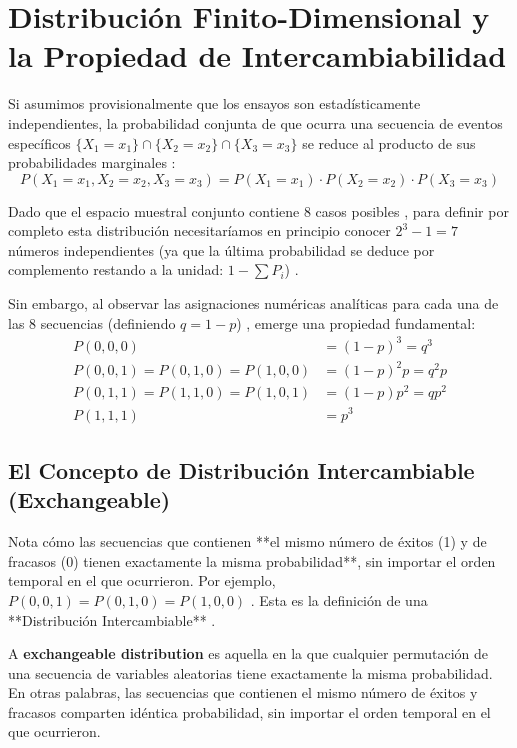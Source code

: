 \section{Distribución Finito-Dimensional y la Propiedad de Intercambiabilidad}

Si asumimos provisionalmente que los ensayos son estadísticamente independientes, la probabilidad conjunta de que ocurra una secuencia de eventos específicos $\{X_1 = x_1\} \cap \{X_2 = x_2\} \cap \{X_3 = x_3\}$ se reduce al producto de sus probabilidades marginales :
\begin{equation}
    P(X_1 = x_1, X_2 = x_2, X_3 = x_3) = P(X_1 = x_1) \cdot P(X_2 = x_2) \cdot P(X_3 = x_3) 
\end{equation}

Dado que el espacio muestral conjunto contiene 8 casos posibles , para definir por completo esta distribución necesitaríamos en principio conocer $2^3 - 1 = 7$ números independientes (ya que la última probabilidad se deduce por complemento restando a la unidad: $1 - \sum P_i$) . 

Sin embargo, al observar las asignaciones numéricas analíticas para cada una de las 8 secuencias (definiendo $q = 1-p$) , emerge una propiedad fundamental:
\begin{equation}
    \begin{aligned}
        P(0,0,0) &= (1-p)^3 = q^3  \\
        P(0,0,1) = P(0,1,0) = P(1,0,0) &= (1-p)^2 p = q^2 p  \\
        P(0,1,1) = P(1,1,0) = P(1,0,1) &= (1-p) p^2 = q p^2  \\
        P(1,1,1) &= p^3 
    \end{aligned}
\end{equation}


\subsection*{El Concepto de Distribución Intercambiable (Exchangeable)}
Nota cómo las secuencias que contienen **el mismo número de éxitos (1) y de fracasos (0) tienen exactamente la misma probabilidad**, sin importar el orden temporal en el que ocurrieron. Por ejemplo, $P(0,0,1) = P(0,1,0) = P(1,0,0)$ . Esta es la definición de una **Distribución Intercambiable** . 

\begin{definicion}
    A \textbf{exchangeable distribution} es aquella en la que cualquier permutación de una secuencia de variables aleatorias tiene exactamente la misma probabilidad. En otras palabras, las secuencias que contienen el mismo número de éxitos y fracasos comparten idéntica probabilidad, sin importar el orden temporal en el que ocurrieron.
\end{definicion}


